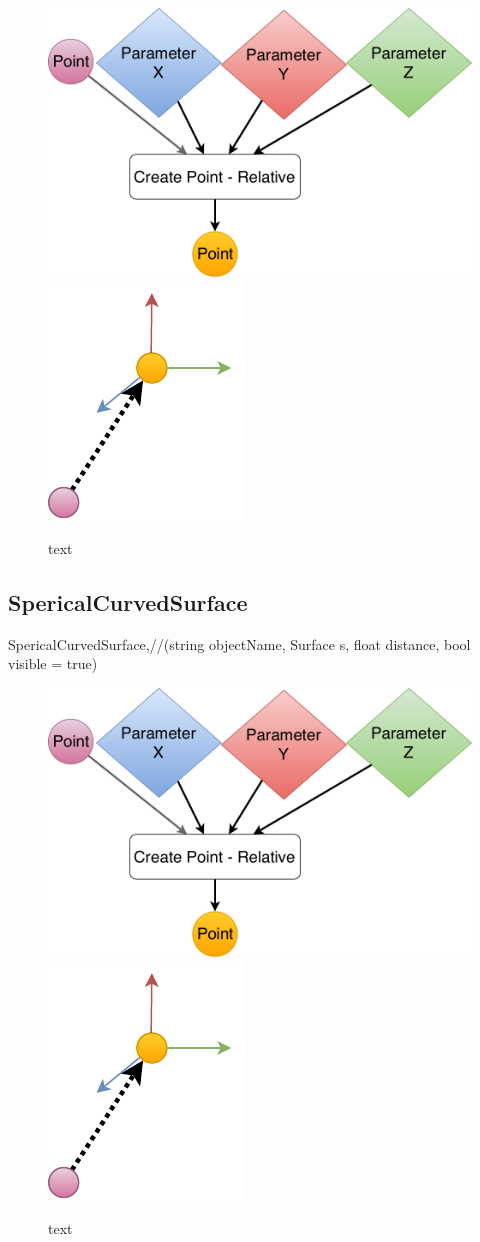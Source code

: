 \begin{figure}[H]
	\centering
	\includegraphics[height=0.3\textwidth]{obrazky-figures/Diagram/DP Navrh operacii-0D - Point2.pdf}
	\includegraphics[height=0.3\textwidth]{obrazky-figures/Diagram/Draw/1Points/DP Navrh operacii-0D - PointRelative.pdf}
	\caption{text}
	\label{fig:1}
\end{figure}


\subsection{SpericalCurvedSurface}
SpericalCurvedSurface,//(string objectName, Surface s, float distance, bool visible = true)

\begin{figure}[H]
	\centering
	\includegraphics[height=0.3\textwidth]{obrazky-figures/Diagram/DP Navrh operacii-0D - Point2.pdf}
	\includegraphics[height=0.3\textwidth]{obrazky-figures/Diagram/Draw/1Points/DP Navrh operacii-0D - PointRelative.pdf}
	\caption{text}
	\label{fig:1}
\end{figure}



